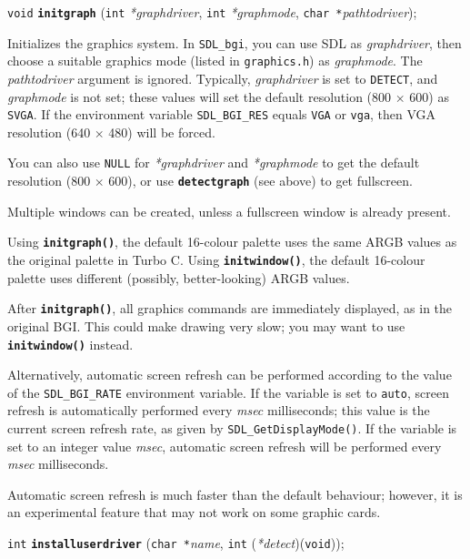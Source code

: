 \documentclass[a4paper,12pt]{article}
\newcommand{\SDLbgi}{\texttt{SDL\_bgi}}
\newcommand{\V}{\texttt{void}}      %
\newcommand{\I}{\texttt{int}}       %
\newcommand{\C}{\texttt{char *}}    %
\newcommand{\func}[1]{\textbf{\texttt{#1}}}  %
\newcommand{\A}[1]{\emph{#1}}       %
\newcommand{\F}[1]{\texttt{#1}}     %
\newcommand{\T}[1]{\texttt{#1}}     %
\newenvironment{bgi}
{ %
  \begin{snugshade}
}
{ %
  \end{snugshade}
}
\begin{document}
\begin{bgi}
\V{} \func{initgraph} (\I{} \A{*graphdriver}, \I{} \A{*graphmode},
\C{}\A{pathtodriver});
\end{bgi}

Initializes the graphics system. In \SDLbgi, you can use SDL as
\A{graphdriver}, then choose a suitable graphics mode (listed in
\F{graphics.h}) as \A{graphmode}. The \A{pathtodriver} argument is
ignored. Typically, \A{graphdriver} is set to \T{DETECT}, and
\A{graphmode} is not set; these values will set the default resolution
(800 $\times$ 600) as \T{SVGA}. If the environment variable
\T{SDL\_BGI\_RES} equals \T{VGA} or \T{vga}, then VGA resolution (640
$\times$ 480) will be forced.

You can also use \T{NULL} for \A{*graphdriver} and \A{*graphmode} to
get the default resolution (800 $\times$ 600), or use
\func{detectgraph} (see above) to get fullscreen.

Multiple windows can be created, unless a fullscreen window is already
present.

Using \func{initgraph()}, the default 16-colour palette uses the same
ARGB values as the original palette in Turbo C. Using
\func{initwindow()}, the default 16-colour palette uses different
(possibly, better-looking) ARGB values.

After \func{initgraph()}, all graphics commands are immediately
displayed, as in the original BGI. This could make drawing very slow;
you may want to use \func{initwindow()} instead.

Alternatively, automatic screen refresh can be performed according to
the value of the \T{SDL\_BGI\_RATE} environment variable. If the
variable is set to \T{auto}, screen refresh is automatically performed
every \A{msec} milliseconds; this value is the current screen refresh
rate, as given by \T{SDL\_GetDisplayMode()}. If the variable is set to
an integer value \A{msec}, automatic screen refresh will be performed
every \A{msec} milliseconds.

Automatic screen refresh is much faster than the default behaviour;
however, it is an experimental feature that may not work on some
graphic cards.


\label{sec:installuserdriver}

\begin{bgi}
\I{} \func{installuserdriver} (\C{}\A{name}, \I{} (\A{*detect})(\V{}));
\end{bgi}
\end{document}
